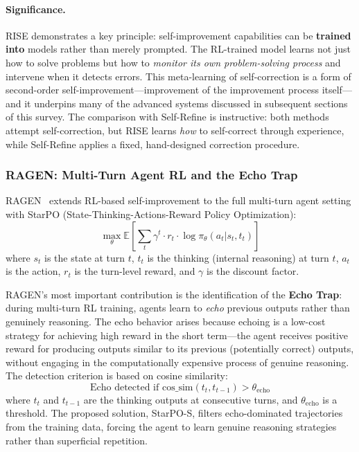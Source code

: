 \paragraph{Significance.}
RISE demonstrates a key principle: self-improvement capabilities can be \textbf{trained into} models rather than merely prompted. The RL-trained model learns not just how to solve problems but how to \emph{monitor its own problem-solving process} and intervene when it detects errors. This meta-learning of self-correction is a form of second-order self-improvement---improvement of the improvement process itself---and it underpins many of the advanced systems discussed in subsequent sections of this survey. The comparison with Self-Refine is instructive: both methods attempt self-correction, but RISE learns \emph{how} to self-correct through experience, while Self-Refine applies a fixed, hand-designed correction procedure.


\subsubsection{RAGEN: Multi-Turn Agent RL and the Echo Trap}
\label{sec:ragen}

RAGEN~\citep{wang2025ragen} extends RL-based self-improvement to the full multi-turn agent setting with StarPO (State-Thinking-Actions-Reward Policy Optimization):
\begin{equation}
    \max_\theta \mathbb{E}\left[\sum_t \gamma^t \cdot r_t \cdot \log \pi_\theta(a_t | s_t, t_t)\right]
    \label{eq:starpo}
\end{equation}
where $s_t$ is the state at turn $t$, $t_t$ is the thinking (internal reasoning) at turn $t$, $a_t$ is the action, $r_t$ is the turn-level reward, and $\gamma$ is the discount factor.

RAGEN's most important contribution is the identification of the \textbf{Echo Trap}: during multi-turn RL training, agents learn to \emph{echo} previous outputs rather than genuinely reasoning. The echo behavior arises because echoing is a low-cost strategy for achieving high reward in the short term---the agent receives positive reward for producing outputs similar to its previous (potentially correct) outputs, without engaging in the computationally expensive process of genuine reasoning. The detection criterion is based on cosine similarity:
\begin{equation}
    \text{Echo detected if } \mathrm{cos\_sim}(t_t, t_{t-1}) > \theta_{\text{echo}}
    \label{eq:echo-trap}
\end{equation}
where $t_t$ and $t_{t-1}$ are the thinking outputs at consecutive turns, and $\theta_{\text{echo}}$ is a threshold. The proposed solution, StarPO-S, filters echo-dominated trajectories from the training data, forcing the agent to learn genuine reasoning strategies rather than superficial repetition.

